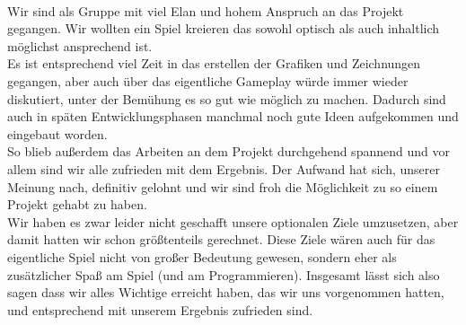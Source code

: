 \documentclass[10pt,a4paper,notitlepage]{report}
\begin{document}
	\\\par\medskip\Text
	Wir sind als Gruppe mit viel Elan und hohem Anspruch an das Projekt gegangen. Wir wollten ein Spiel kreieren das sowohl optisch als auch inhaltlich möglichst ansprechend ist.\\
	Es ist entsprechend viel Zeit in das erstellen der Grafiken und Zeichnungen gegangen, aber auch über das eigentliche Gameplay würde immer wieder diskutiert, unter der Bemühung es so gut wie möglich zu machen. Dadurch sind auch in späten Entwicklungsphasen manchmal noch gute Ideen aufgekommen und eingebaut worden.\\
	So blieb außerdem das Arbeiten an dem Projekt durchgehend spannend und vor allem sind wir alle zufrieden mit dem Ergebnis. Der Aufwand hat sich, unserer Meinung nach, definitiv gelohnt und wir sind froh die Möglichkeit zu so einem Projekt gehabt zu haben.\\
	Wir haben es zwar leider nicht geschafft unsere optionalen Ziele umzusetzen, aber damit hatten wir schon größtenteils gerechnet. Diese Ziele wären auch für das eigentliche Spiel nicht von großer Bedeutung gewesen, sondern eher als zusätzlicher Spaß am Spiel (und am Programmieren).
	Insgesamt lässt sich also sagen dass wir alles Wichtige erreicht haben, das wir uns vorgenommen hatten, und entsprechend mit unserem Ergebnis zufrieden sind.\\\par\smallskip
	
	\\\par\medskip\Text

	\clearpage
	\marginpar{\vspace{3.0mm} \color{orange}\rule{0.8mm}{53.3mm} \\[3mm] \color{hellorange}\rule{0.8mm}{170mm}}
	\par\bigskip
	
\end{document}
